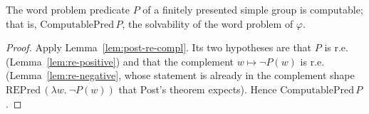 \begin{theorem}
    \label{thm:boone-higman-simple}
    \leanok
    The word problem predicate $P$ of a finitely presented simple group is
    computable; that is, $\mathrm{ComputablePred}\,P$, the solvability of the word
    problem of $\varphi$.
\end{theorem}
\begin{proof}
    Apply Lemma~\ref{lem:post-re-compl}. Its two hypotheses are that $P$ is r.e.
    (Lemma~\ref{lem:re-positive}) and that the complement $w \mapsto \neg P(w)$ is
    r.e. (Lemma~\ref{lem:re-negative}, whose statement is already in the
    complement shape $\mathrm{REPred}\,(\lambda w.\ \neg P(w))$ that Post's theorem
    expects). Hence $\mathrm{ComputablePred}\,P$.
\end{proof}



